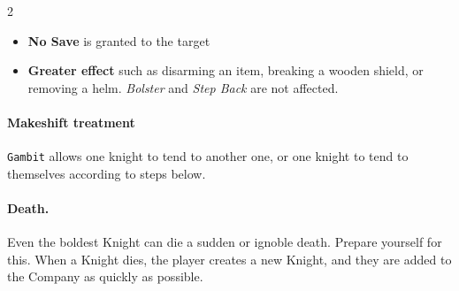 \begin{multicols*}{2}
\begin{itemize}[nosep, leftmargin=*]
    \item \textbf{No Save} is granted to the target
    \item \textbf{Greater effect} such as disarming an item, breaking a wooden shield, or removing a helm. \emph{Bolster} and \emph{Step Back} are not affected.
\end{itemize}

\paragraph{Makeshift treatment} \texttt{Gambit} allows one knight to tend to another one, or one knight to tend to themselves according to steps below.


\paragraph{Death.} Even the boldest Knight can die a sudden or ignoble death. Prepare yourself for this.
When a Knight dies, the player creates a new Knight, and they are added to the Company as quickly as possible.

\end{multicols*}
